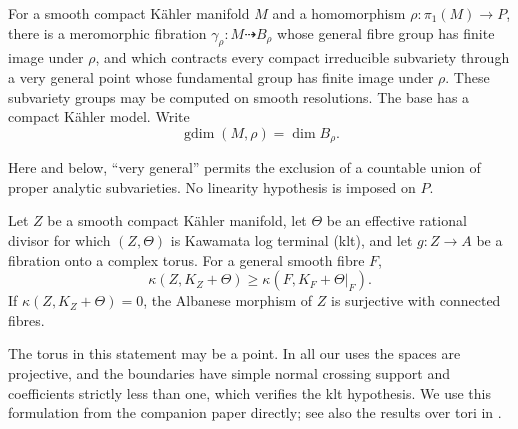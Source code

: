 \begin{assumption}\label{in:input-reduction}
For a smooth compact K\"ahler manifold $M$ and a homomorphism
$\rho:\pi_1(M)\to P$, there is a meromorphic fibration
$\gamma_\rho:M\dashrightarrow B_\rho$ whose general fibre group has
finite image under $\rho$, and which contracts every compact
irreducible subvariety through a very general point whose fundamental
group has finite image under $\rho$.  These subvariety groups may be
computed on smooth resolutions.  The base has a compact K\"ahler
model.  Write
\[
 \operatorname{gdim}(M,\rho)=\dim B_\rho.
\]
\end{assumption}

Here and below, ``very general'' permits the exclusion of a countable
union of proper analytic subvarieties.  No linearity hypothesis is
imposed on $P$.

\begin{assumption}\label{in:input-tori}
Let $Z$ be a smooth compact K\"ahler manifold, let $\Theta$ be an
effective rational divisor for which $(Z,\Theta)$ is Kawamata log
terminal (klt), and let
$g:Z\to A$ be a fibration onto a complex torus.  For a general smooth
fibre $F$,
\[
 \kappa(Z,K_Z+\Theta)\ge
 \kappa(F,K_F+\Theta|_F).
\]
If $\kappa(Z,K_Z+\Theta)=0$, the Albanese morphism of $Z$ is
surjective with connected fibres.
\end{assumption}

The torus in this statement may be a point.  In all our uses the spaces
are projective, and the boundaries have simple normal crossing support
and coefficients strictly less than one, which verifies the klt
hypothesis.  We use this formulation from the companion paper directly; see also the
results over tori in \cite{Wang}.

